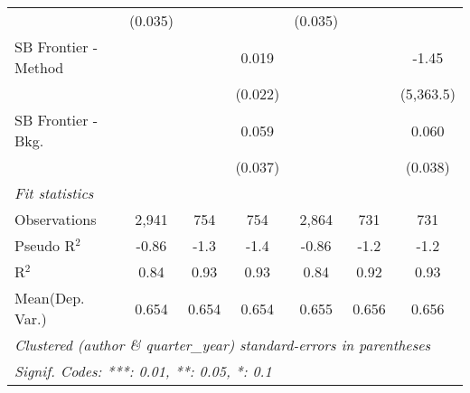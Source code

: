 \begin{tabular}{lcccccc}
                                & (0.035)      &         &              & (0.035)      &             &   \\   
   SB Frontier - Method         &              &         & 0.019        &              &             & -1.45\\   
                                &              &         & (0.022)      &              &             & (5,363.5)\\   
   SB Frontier - Bkg.           &              &         & 0.059        &              &             & 0.060\\   
                                &              &         & (0.037)      &              &             & (0.038)\\   
   \midrule
   \emph{Fit statistics}\\
   Observations                 & 2,941        & 754     & 754          & 2,864        & 731         & 731\\  
   Pseudo R$^2$                 & -0.86        & -1.3    & -1.4         & -0.86        & -1.2        & -1.2\\  
   R$^2$                        & 0.84         & 0.93    & 0.93         & 0.84         & 0.92        & 0.93\\  
Mean(Dep. Var.) & 0.654 & 0.654 & 0.654 & 0.655 & 0.656 & 0.656 \\
   \midrule \midrule
   \multicolumn{7}{l}{\emph{Clustered (author \& quarter\_year) standard-errors in parentheses}}\\
   \multicolumn{7}{l}{\emph{Signif. Codes: ***: 0.01, **: 0.05, *: 0.1}}\\
\end{tabular}
\par\endgroup
